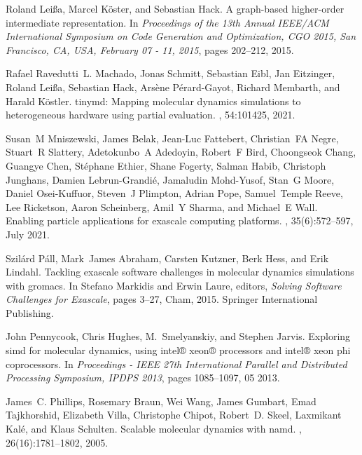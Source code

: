 \documentclass[Afour,sageh,times]{sagej}
\begin{document}
\begin{thebibliography}{99}
Roland Lei{\ss}a, Marcel K{\"{o}}ster, and Sebastian Hack.
\newblock A graph-based higher-order intermediate representation.
\newblock In {\em Proceedings of the 13th Annual {IEEE/ACM} International
  Symposium on Code Generation and Optimization, {CGO} 2015, San Francisco, CA,
  USA, February 07 - 11, 2015}, pages 202--212, 2015.

Rafael Ravedutti~L. Machado, Jonas Schmitt, Sebastian Eibl, Jan Eitzinger,
  Roland Leißa, Sebastian Hack, Arsène Pérard-Gayot, Richard Membarth, and
  Harald Köstler.
\newblock tinymd: Mapping molecular dynamics simulations to heterogeneous
  hardware using partial evaluation.
, 54:101425, 2021.

Susan~M Mniszewski, James Belak, Jean-Luc Fattebert, Christian~FA Negre,
  Stuart~R Slattery, Adetokunbo~A Adedoyin, Robert~F Bird, Choongseok Chang,
  Guangye Chen, Stéphane Ethier, Shane Fogerty, Salman Habib, Christoph
  Junghans, Damien Lebrun-Grandié, Jamaludin Mohd-Yusof, Stan~G Moore, Daniel
  Osei-Kuffuor, Steven~J Plimpton, Adrian Pope, Samuel~Temple Reeve, Lee
  Ricketson, Aaron Scheinberg, Amil~Y Sharma, and Michael~E Wall.
\newblock Enabling particle applications for exascale computing platforms.
, 35(6):572–597, July 2021.

Szil{\'a}rd P{\'a}ll, Mark~James Abraham, Carsten Kutzner, Berk Hess, and Erik
  Lindahl.
\newblock Tackling exascale software challenges in molecular dynamics
  simulations with gromacs.
\newblock In Stefano Markidis and Erwin Laure, editors, {\em Solving Software
  Challenges for Exascale}, pages 3--27, Cham, 2015. Springer International
  Publishing.

John Pennycook, Chris Hughes, M.~Smelyanskiy, and Stephen Jarvis.
\newblock Exploring simd for molecular dynamics, using intel® xeon®
  processors and intel® xeon phi coprocessors.
\newblock In {\em Proceedings - IEEE 27th International Parallel and
  Distributed Processing Symposium, IPDPS 2013}, pages 1085--1097, 05 2013.

James~C. Phillips, Rosemary Braun, Wei Wang, James Gumbart, Emad Tajkhorshid,
  Elizabeth Villa, Christophe Chipot, Robert~D. Skeel, Laxmikant Kalé, and
  Klaus Schulten.
\newblock Scalable molecular dynamics with namd.
, 26(16):1781--1802, 2005.


\end{thebibliography}
\end{document}
